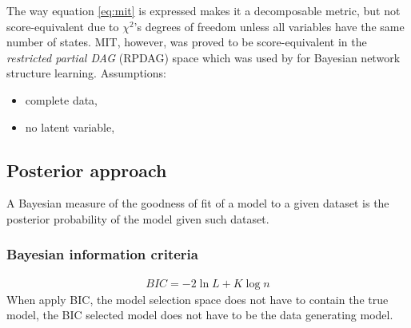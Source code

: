 The way equation \ref{eq:mit} is expressed makes it a decomposable metric, but not score-equivalent due to $\chi^2$'s degrees of freedom unless all variables have the same number of states. MIT, however, was proved to be score-equivalent in the \textit{restricted partial DAG} (RPDAG) space which was used by \cite{acid2003searching} for Bayesian network structure learning. 
Assumptions: 
\begin{itemize}
\item complete data, 
\item no latent variable,
\end{itemize}

\subsection{Posterior approach}
A Bayesian measure of the goodness of fit of a model to a given dataset is the posterior probability of the model given such dataset. 

\subsubsection{Bayesian information criteria}
\cite{schwarz1978estimating}
\begin{align}
\label{eq:bic}
BIC = -2\ln L + K \log n
\end{align}
When apply BIC, the model selection space does not have to contain the true model, the BIC selected model does not have to be the data generating model. 


